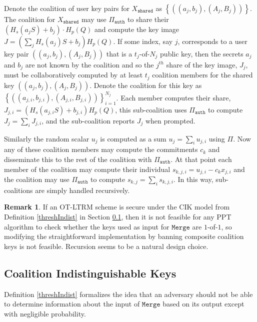 \documentclass{mrl}
\theoremstyle{definition}
\newtheorem{disc}[theorem]{Remark}
\begin{document}
Denote the coalition of user key pairs for $X_{\texttt{shared}}$ as $\left\{((a_{j}, b_{j}), (A_{j}, B_{j}))\right\}$. The coalition for $X_\texttt{shared}$ may use $\Pi_{\texttt{auth}}$ to share their $(H_s(a_{j} S) + b_{j})\cdot H_p(Q)$ and compute the key image $J = (\sum_j H_s(a_{j})S + b_{j}) H_p(Q)$. If some index, say $j$, corresponds to a user key pair $((a_j,b_j),(A_j,B_j))$ that is a $t_j$-of-$N_j$ public key, then the secrets $a_j$ and $b_j$ are not known by the coalition and so the $j^{th}$ share of the key image, $J_j$, must be collaboratively computed by at least $t_j$ coalition members for the shared key $((a_j,b_j),(A_j,B_j))$. Denote the coalition for this key as $\left\{((a_{j,i}, b_{j,i}), (A_{j,i}, B_{j,i}))\right\}_{i=1}^{N_j}$. Each member computes their share, $J_{j,i} = (H_s(a_{j,i} S) + b_{j,i})H_p(Q)$, this sub-coalition uses $\Pi_{\texttt{auth}}$ to compute $J_j = \sum_i J_{j,i}$, and the sub-coalition reports $J_j$ when prompted.

Similarly the random scalar $u_j$ is computed as a sum $u_j = \sum_i u_{j,i}$ using $\Pi$. Now any of these coalition members may compute the commitments $c_k$ and disseminate this to the rest of the coalition with $\Pi_{\texttt{auth}}$. At that point each member of the coalition may compute their individual $s_{k,j,i} = u_{j,i} - c_k x_{j,i}$ and the coalition may use $\Pi_{\texttt{auth}}$ to compute $s_{k,j} = \sum_i s_{k,j,i}$. In this way, sub-coalitions are simply handled recursively.

\begin{disc} 
If an OT-LTRM scheme is secure under the CIK model from Definition \ref{threshIndist} in Section \ref{subsec:CIK}, then it is not feasible for any PPT algorithm to check whether the keys used as input for $\texttt{Merge}$ are $1$-of-$1$, so modifying the straightforward implementation by banning composite coalition keys is not feasible. Recursion seems to be a natural design choice.
\end{disc}


\subsection{Coalition Indistinguishable Keys} \label{subsec:CIK}

Definition \ref{threshIndist} formalizes the idea that an adversary should not be able to determine information about the input of $\texttt{Merge}$ based on its output except with negligible probability. %
\end{document}
